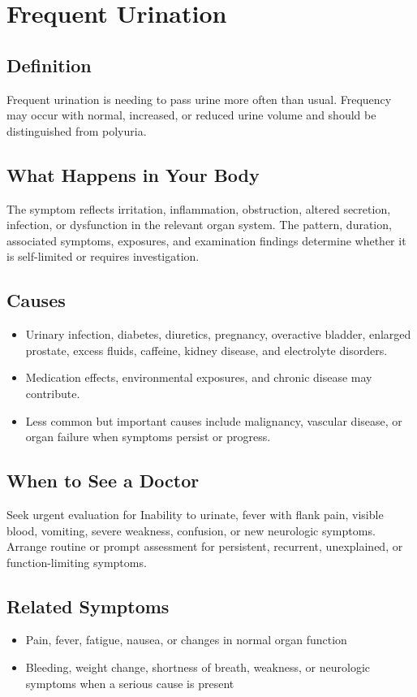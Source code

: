 \chapter{Frequent Urination}

\section*{Definition}
Frequent urination is needing to pass urine more often than usual. Frequency may occur with normal, increased, or reduced urine volume and should be distinguished from polyuria.

\section*{What Happens in Your Body}
The symptom reflects irritation, inflammation, obstruction, altered secretion, infection, or dysfunction in the relevant organ system. The pattern, duration, associated symptoms, exposures, and examination findings determine whether it is self-limited or requires investigation.

\section*{Causes}
\begin{itemize}
  \item Urinary infection, diabetes, diuretics, pregnancy, overactive bladder, enlarged prostate, excess fluids, caffeine, kidney disease, and electrolyte disorders.
  \item Medication effects, environmental exposures, and chronic disease may contribute.
  \item Less common but important causes include malignancy, vascular disease, or organ failure when symptoms persist or progress.
\end{itemize}

\section*{When to See a Doctor}
Seek urgent evaluation for Inability to urinate, fever with flank pain, visible blood, vomiting, severe weakness, confusion, or new neurologic symptoms. Arrange routine or prompt assessment for persistent, recurrent, unexplained, or function-limiting symptoms.

\section*{Related Symptoms}
\begin{itemize}
  \item Pain, fever, fatigue, nausea, or changes in normal organ function
  \item Bleeding, weight change, shortness of breath, weakness, or neurologic symptoms when a serious cause is present
\end{itemize}

